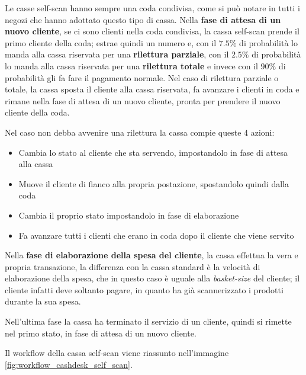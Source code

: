 Le casse self-scan hanno sempre una coda condivisa, come si può notare in tutti i negozi che hanno adottato questo tipo di cassa. Nella \textbf{fase di attesa di un nuovo cliente}, se ci sono clienti nella coda condivisa, la cassa self-scan prende il primo cliente della coda; estrae quindi un numero e, con il $7.5 \%$ di probabilità lo manda alla cassa riservata per una \textbf{rilettura parziale}, con il $2.5 \%$ di probabilità lo manda alla cassa riservata per una \textbf{rilettura totale} e invece con il $90 \%$ di probabilità gli fa fare il pagamento normale. Nel caso di rilettura parziale o totale, la cassa sposta il cliente alla cassa riservata, fa avanzare i clienti in coda e rimane nella fase di attesa di un nuovo cliente, pronta per prendere il nuovo cliente della coda.

Nel caso non debba avvenire una rilettura la cassa compie queste 4 azioni:

\begin{itemize}
\item Cambia lo stato al cliente che sta servendo, impostandolo in fase di attesa alla cassa
\item Muove il cliente di fianco alla propria postazione, spostandolo quindi dalla coda
\item Cambia il proprio stato impostandolo in fase di elaborazione
\item Fa avanzare tutti i clienti che erano in coda dopo il cliente che viene servito
\end{itemize}

Nella \textbf{fase di elaborazione della spesa del cliente}, la cassa effettua la vera e propria transazione, la differenza con la cassa standard è la velocità di elaborazione della spesa, che in questo caso è uguale alla \textit{basket-size} del cliente; il cliente infatti deve soltanto pagare, in quanto ha già scannerizzato i prodotti durante la sua spesa.

Nell'ultima fase la cassa ha terminato il servizio di un cliente, quindi si rimette nel primo stato, in fase di attesa di un nuovo cliente.

Il workflow della cassa self-scan viene riassunto nell'immagine \ref{fig:workflow_cashdesk_self_scan}.

